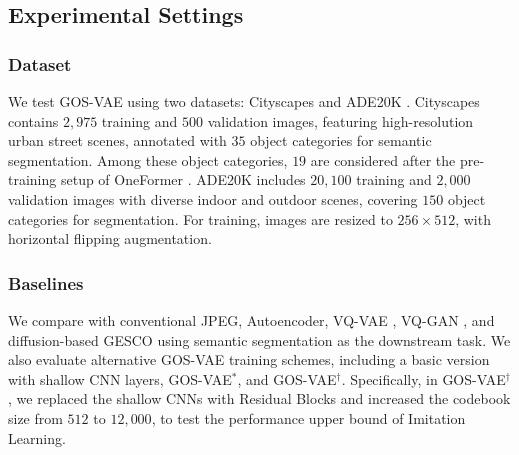 \subsection{Experimental Settings} \label{sec:exp}
\vspace*{-1mm}
\subsubsection{Dataset} We test GOS-VAE using two datasets: Cityscapes \cite{cordts2016cityscapes} and ADE20K \cite{zhou2019semantic}. Cityscapes contains $2,975$ training and $500$ validation images, featuring high-resolution urban street scenes, annotated with $35$ object categories for semantic segmentation. Among these object categories, $19$ are considered
after the pre-training setup of OneFormer \cite{jain2023oneformer}. ADE20K includes $20,100$ training and $2,000$ validation images with diverse 
indoor and outdoor scenes, covering $150$ object categories for segmentation. For training, images are resized to $256 \times 512$, with horizontal flipping augmentation.

\subsubsection{Baselines}
We compare with conventional JPEG, Autoencoder, VQ-VAE \cite{van2017neural}, VQ-GAN \cite{esser2021taming}, and diffusion-based GESCO \cite{grassucci2023generative} using semantic segmentation as the downstream task. We also evaluate alternative GOS-VAE training schemes, including a basic version with shallow CNN layers, GOS-VAE$^{*}$, and GOS-VAE$^{\dagger}$. Specifically, in GOS-VAE$^{\dagger}$, we replaced the shallow CNNs with Residual Blocks \cite{he2016deep} and increased the codebook size from $512$ to $12,000$, to test the performance upper bound of Imitation Learning.



